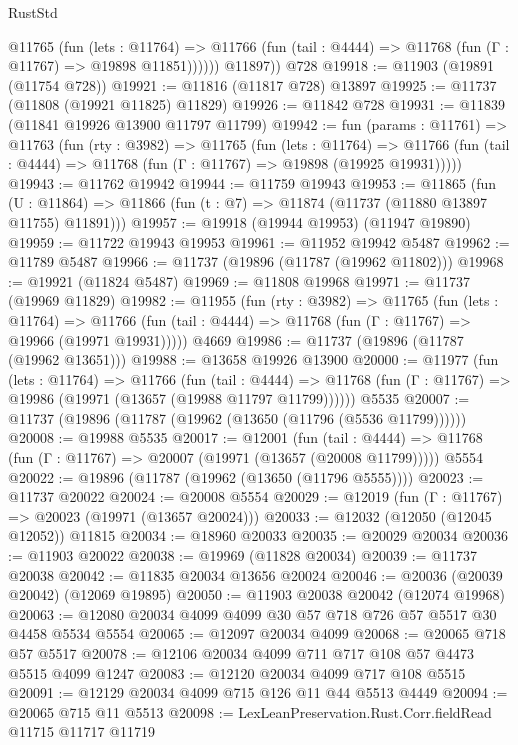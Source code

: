 \begin{lexlean}{RustStd}
\begin{coremodule}
            @11765
              (fun (lets : @11764) =>
              @11766 (fun (tail : @4444) => @11768 (fun (Γ : @11767) => @19898 @11851))))))
        @11897))
    @728
@19918 := @11903 (@19891 (@11754 @728))
@19921 := @11816 (@11817 @728) @13897
@19925 := @11737 (@11808 (@19921 @11825) @11829)
@19926 := @11842 @728
@19931 := @11839 (@11841 @19926 @13900 @11797 @11799)
@19942 := fun (params : @11761) =>
  @11763
    (fun (rty : @3982) =>
    @11765
      (fun (lets : @11764) =>
      @11766 (fun (tail : @4444) => @11768 (fun (Γ : @11767) => @19898 (@19925 @19931)))))
@19943 := @11762 @19942
@19944 := @11759 @19943
@19953 := @11865
    (fun (U : @11864) => @11866 (fun (t : @7) => @11874 (@11737 (@11880 @13897 @11755) @11891)))
@19957 := @19918 (@19944 @19953) (@11947 @19890)
@19959 := @11722 @19943 @19953
@19961 := @11952 @19942 @5487
@19962 := @11789 @5487
@19966 := @11737 (@19896 (@11787 (@19962 @11802)))
@19968 := @19921 (@11824 @5487)
@19969 := @11808 @19968
@19971 := @11737 (@19969 @11829)
@19982 := @11955
    (fun (rty : @3982) =>
    @11765
      (fun (lets : @11764) =>
      @11766 (fun (tail : @4444) => @11768 (fun (Γ : @11767) => @19966 (@19971 @19931)))))
    @4669
@19986 := @11737 (@19896 (@11787 (@19962 @13651)))
@19988 := @13658 @19926 @13900
@20000 := @11977
    (fun (lets : @11764) =>
    @11766
      (fun (tail : @4444) =>
      @11768 (fun (Γ : @11767) => @19986 (@19971 (@13657 (@19988 @11797 @11799))))))
    @5535
@20007 := @11737 (@19896 (@11787 (@19962 (@13650 (@11796 (@5536 @11799))))))
@20008 := @19988 @5535
@20017 := @12001
    (fun (tail : @4444) => @11768 (fun (Γ : @11767) => @20007 (@19971 (@13657 (@20008 @11799)))))
    @5554
@20022 := @19896 (@11787 (@19962 (@13650 (@11796 @5555))))
@20023 := @11737 @20022
@20024 := @20008 @5554
@20029 := @12019 (fun (Γ : @11767) => @20023 (@19971 (@13657 @20024)))
@20033 := @12032 (@12050 (@12045 @12052)) @11815
@20034 := @18960 @20033
@20035 := @20029 @20034
@20036 := @11903 @20022
@20038 := @19969 (@11828 @20034)
@20039 := @11737 @20038
@20042 := @11835 @20034 @13656 @20024
@20046 := @20036 (@20039 @20042) (@12069 @19895)
@20050 := @11903 @20038 @20042 (@12074 @19968)
@20063 := @12080 @20034 @4099 @4099 @30 @57 @718 @726 @57 @5517 @30 @4458 @5534 @5554
@20065 := @12097 @20034 @4099
@20068 := @20065 @718 @57 @5517
@20078 := @12106 @20034 @4099 @711 @717 @108 @57 @4473 @5515 @4099 @1247
@20083 := @12120 @20034 @4099 @717 @108 @5515
@20091 := @12129 @20034 @4099 @715 @126 @11 @44 @5513 @4449
@20094 := @20065 @715 @11 @5513
@20098 := LexLeanPreservation.Rust.Corr.fieldRead @11715 @11717 @11719

\end{coremodule}
\end{lexlean}
